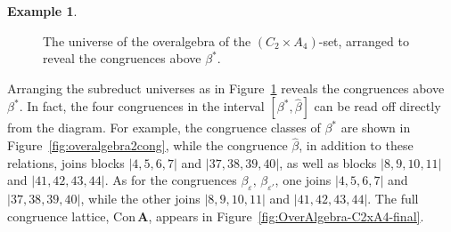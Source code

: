 \documentclass[cm,dissertation,actual,final]{uhthesis}
\theoremstyle{plain}
\theoremstyle{definition}
\newtheorem{example}[theorem]{Example}
\theoremstyle{remark}
\numberwithin{theorem}{section}
\numberwithin{claim}{chapter}
\numberwithin{equation}{section}
\numberwithin{conjecture}{chapter}
\newcommand{\<}{\ensuremath{\langle}}
\renewcommand{\>}{\ensuremath{\rangle}}
\newcommand{\Con}{\ensuremath{\mathrm{Con\,}}}
\newcommand{\0}{\ensuremath{\mathbf{0}}}
\newcommand{\1}{\ensuremath{\mathbf{1}}}
\newcommand{\2}{\ensuremath{\mathbf{2}}}
\newcommand{\3}{\ensuremath{\mathbf{3}}}
\newcommand{\4}{\ensuremath{\mathbf{4}}}
\newcommand{\5}{\ensuremath{\mathbf{5}}}
\newcommand{\bA}{\ensuremath{\mathbf{A}}}
\newcommand{\eps}{\ensuremath{\varepsilon}}
\begin{document}
\begin{example}
\begin{figure}[h!]
{
        }
        \caption{The universe of the overalgebra of the $(C_2\times A_4)$-set,
          arranged to reveal the congruences above $\beta^*$.}
        \label{fig:overalgebra2}
  \end{figure}

  Arranging the subreduct universes as in Figure~\ref{fig:overalgebra2}
  reveals the congruences above $\beta^*$.  
  In fact, the four congruences in the interval $[\beta^*, \widehat{\beta}]$ can be read off
  directly from the diagram.   For example, the congruence classes of $\beta^*$
  are shown in Figure~\ref{fig:overalgebra2cong}, while 
  the congruence $\widehat{\beta}$, in addition to these relations, joins blocks 
  $|4, 5, 6, 7|$ and $|37, 38, 39, 40|$, 
  as well as blocks $|8,9,10,11|$ and $|41,42,43,44|$.
  As for the congruences $\beta_\eps, \, \beta_{\eps'}$, one joins
  $|4, 5, 6, 7|$ and $|37, 38, 39, 40|$, while the other joins
  $|8,9,10,11|$ and $|41,42,43,44|$.  The full congruence lattice, $\Con \bA$,
  appears in Figure~\ref{fig:OverAlgebra-C2xA4-final}.



\end{example}
\end{document}
